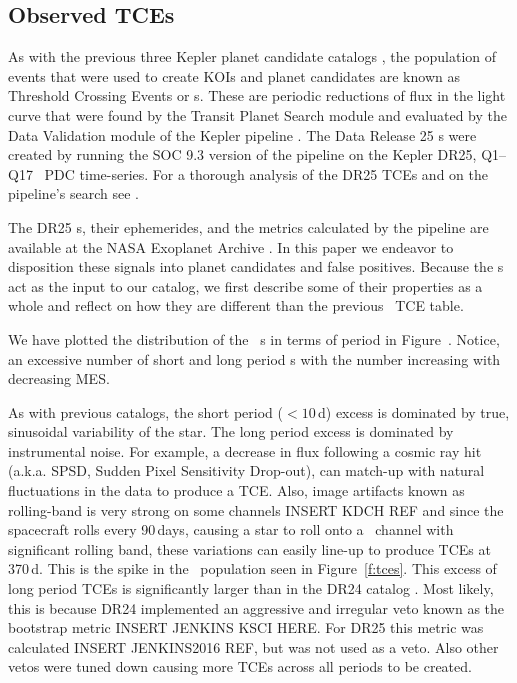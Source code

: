 \subsection{Observed TCEs}

\label{s:tces}
As with the previous three Kepler planet candidate catalogs \citep{Coughlin2016,Mullally2015cat,Rowe2015cat}, the population of events that were used to create KOIs and planet candidates are known as Threshold Crossing Events or \opstce s.  These are periodic reductions of flux in the light curve that were found by the Transit Planet Search module and evaluated by the Data Validation module of the Kepler pipeline \citep{JenkinsKDPH}.   The Data Release 25 \opstce s were created by running the SOC 9.3 version of the pipeline on the Kepler DR25, Q1--Q17 \Kepler\ PDC time-series.  For a thorough analysis of the DR25 TCEs and on the pipeline's search see \citet{Twicken2016}.  

The DR25 \opstce s, their ephemerides, and the metrics calculated by the pipeline are available at the NASA Exoplanet Archive \citep{Akeson2013}.  In this paper we endeavor to disposition these signals into planet candidates and false positives.   Because the \opstce s act as the input to our catalog, we first describe some of their properties as a whole and reflect on how they are different than the previous \Kepler\ TCE table.

We have plotted the distribution of the \ntcesnorogue\ \opstce s in terms of period in Figure~\label{f:tces}. Notice, an excessive number of short and long period \opstce s with the number increasing with decreasing MES. 

As with previous catalogs, the short period ($<10$\,d) excess is dominated by true, sinusoidal variability of the star. The long period excess is dominated by instrumental noise. For example, a decrease in flux following a cosmic ray hit (a.k.a. SPSD, Sudden Pixel Sensitivity Drop-out), can match-up with natural fluctuations in the data to produce a TCE. Also, image artifacts known as rolling-band is very strong on some channels INSERT KDCH REF\citep[see page][]{KDCH}  and since the spacecraft rolls every 90\,days, causing a star to roll onto a \Kepler\ channel with significant rolling band, these variations can easily line-up to produce TCEs at 370\,d. This is the spike in the \opstce\ population seen in Figure~\ref{f:tces}. This excess of long period TCEs is significantly larger than in the DR24 catalog \citep{Seader2015}. Most likely, this is because DR24 implemented an aggressive and irregular veto known as the bootstrap metric \citep{}INSERT JENKINS KSCI HERE.  For DR25 this metric was calculated INSERT JENKINS2016 REF, but was not used as a veto.  Also other vetos were tuned down causing more TCEs across all periods to be created.  %


